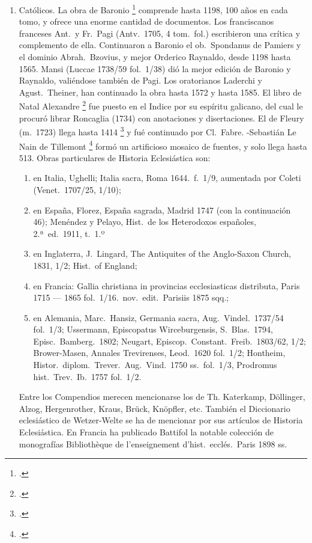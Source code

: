\raggedbottom{} \documentclass[12pt, a4paper, openany]{book} %
\begin{document}
\begin{enumerate}
  \item Católicos. La obra de Baronio \footcite{Baronio1588Annales} comprende hasta 1198, 100 años en cada tomo, y ofrece una enorme cantidad de documentos. Los franciscanos franceses Ant.\ y Fr.\ Pagi (Antv.\ 1705, 4 tom.\ fol.) escribieron una crítica y complemento de ella. Continuaron a Baronio el ob.\ Spondanus de Pamiers y el dominio Abrah.\ Bzovius, y mejor Orderico Raynaldo, desde 1198 hasta 1565. Mansi (Luccae 1738/59 fol.\ 1/38) dió la mejor edición de Baronio y Raynaldo, valiéndose también de Pagi. Los oratorianos Laderchi y Agust.\ Theiner, han continuado la obra hasta 1572 y hasta 1585. El libro de Natal Alexandre \footcite{Natal1676Selecta} fue puesto en el Indice por su espíritu galicano, del cual le procuró librar Roncaglia (1734) con anotaciones y disertaciones. El de Fleury (m.\ 1723) llega hasta 1414 \footcite{FleuryFabre1691Histoire} y fué continuado por Cl.\ Fabre. -Sebastián Le Nain de Tillemont \footcite{Tillemont1693Mem} formó un artificioso mosaico de fuentes, y solo llega hasta 513. Obras particulares de Historia Eclesiástica son:\begin{enumerate}
          \item en Italia, Ughelli; Italia sacra, Roma 1644.\ f.\ 1/9, aumentada por Coleti (Venet.\ 1707/25, 1/10);
          \item en España, Florez, España sagrada, Madrid 1747 (con la continuación 46); Menéndez y Pelayo, Hist.\ de los Heterodoxos españoles, 2.ª\ ed.\ 1911, t.\ 1.º\
          \item en Inglaterra, J.\ Lingard, The Antiquites of the Anglo-Saxon Church, 1831, 1/2; Hist.\ of England;
          \item en Francia: Gallia christiana in provincias ecclesiasticas distributa, Paris 1715 --- 1865 fol.\ 1/16.\ nov.\ edit.\ Parisiis 1875 sqq.;
          \item en Alemania, Marc.\ Hansiz, Germania sacra, Aug.\ Vindel.\ 1737/54 fol.\ 1/3; Ussermann, Episcopatus Wirceburgensis, S.\ Blas.\ 1794, Episc.\ Bamberg.\ 1802; Neugart, Episcop.\ Constant.\ Freib.\ 1803/62, 1/2; Brower-Masen, Annales Trevirenses, Leod.\ 1620 fol.\ 1/2; Hontheim, Histor.\ diplom.\ Trever.\ Aug.\ Vind.\ 1750 ss.\ fol.\ 1/3, Prodromus hist.\ Trev.\ Ib.\ 1757 fol.\ 1/2.
        \end{enumerate}
        Entre los Compendios merecen mencionarse los de Th. Katerkamp, Döllinger, Alzog, Hergenrother, Kraus, Brück, Knöpfler, etc. También el Diccionario eclesiástico de Wetzer-Welte se ha de mencionar por sus artículos de Historia Eclesiástica. En Francia ha publicado Battifol la notable colección de monografías Bibliothèque de l'enseignement d'hist.\ ecclés.\ Paris 1898 ss.

\end{enumerate}
\end{document}
